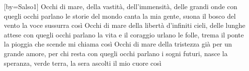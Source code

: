 [by={Salso1}]
\beginverse
Occhi di mare, della vastità,
dell'immensità, delle grandi onde
con quegli occhi parlano le storie del mondo
canta la mia gente, suona il bosco
del vento la voce sussurra così
Occhi di mare della libertà
d'infiniti cieli, delle lunghe attese
con quegli occhi parlano la vita e il coraggio
urlano le folle, trema il ponte
la pioggia che scende mi chiama così
Occhi di mare della tristezza
già per un grande amore, per chi resta
con quegli occhi parlano i sogni futuri,
nasce la speranza, verde terra,
la sera ascolti il mio cuore così
\endverse
\endsong
